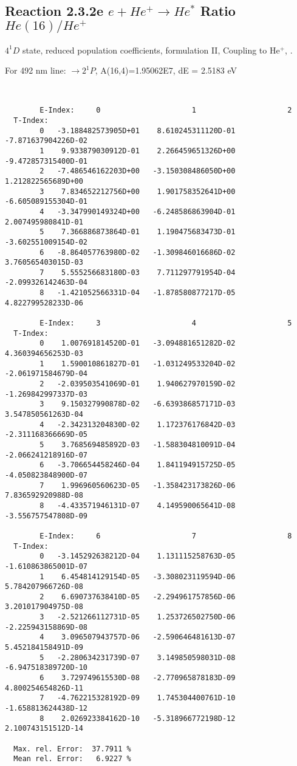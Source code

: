 \documentclass[12pt,dvipdfmx]{article}
\begin{document}
\subsection{
  Reaction 2.3.2e $e + He^+ \rightarrow He^*  $ Ratio $He(16)/He^+$
}

  $4^1D$ state,
  reduced population coefficients, formulation II,
  Coupling to He$^+$, \cite{kn:Fujimoto}.

  For 492 nm line: $\rightarrow 2^1P$, A(16,4)=1.95062E7, dE = 2.5183 eV

\begin{small}\begin{verbatim}


        E-Index:     0                     1                     2
  T-Index:
        0   -3.188482573905D+01    8.610245311120D-01   -7.871637904226D-02
        1    9.933879030912D-01    2.266459651326D+00   -9.472857315400D-01
        2   -7.486546162203D+00   -3.150308486050D+00    1.212822565689D+00
        3    7.834652212756D+00    1.901758352641D+00   -6.605089155304D-01
        4   -3.347990149324D+00   -6.248586863904D-01    2.007495980841D-01
        5    7.366886873864D-01    1.190475683473D-01   -3.602551009154D-02
        6   -8.864057763980D-02   -1.309846016686D-02    3.760565403015D-03
        7    5.555256683180D-03    7.711297791954D-04   -2.099326142463D-04
        8   -1.421052566331D-04   -1.878580877217D-05    4.822799528233D-06

        E-Index:     3                     4                     5
  T-Index:
        0    1.007691814520D-01   -3.094881651282D-02    4.360394656253D-03
        1    1.590010861827D-01   -1.031249533204D-02   -2.061971584679D-04
        2   -2.039503541069D-01    1.940627970159D-02   -1.269842997337D-03
        3    9.150327990878D-02   -6.639386857171D-03    3.547850561263D-04
        4   -2.342313204830D-02    1.172376176842D-03   -2.311168366669D-05
        5    3.768569485892D-03   -1.588304810091D-04   -2.066241218916D-07
        6   -3.706654458246D-04    1.841194915725D-05   -4.050823848900D-07
        7    1.996960560623D-05   -1.358423173826D-06    7.836592920988D-08
        8   -4.433571946131D-07    4.149590065641D-08   -3.556757547808D-09

        E-Index:     6                     7                     8
  T-Index:
        0   -3.145292638212D-04    1.131115258763D-05   -1.610863865001D-07
        1    6.454814129154D-05   -3.308023119594D-06    5.784207966726D-08
        2    6.690737638410D-05   -2.294961757856D-06    3.201017904975D-08
        3   -2.521266112731D-05    1.253726502750D-06   -2.225943158869D-08
        4    3.096507943757D-06   -2.590646481613D-07    5.452184158491D-09
        5   -2.280634231739D-07    3.149850598031D-08   -6.947518389720D-10
        6    3.729749615530D-08   -2.770965878183D-09    4.800254654826D-11
        7   -4.762215328192D-09    1.745304400761D-10   -1.658813624438D-12
        8    2.026923384162D-10   -5.318966772198D-12    2.100743151512D-14

  Max. rel. Error:  37.7911 %
  Mean rel. Error:   6.9227 %



\end{verbatim}\end{small}
\end{document}
